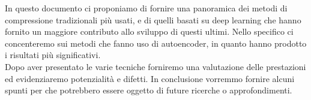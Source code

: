 \documentclass[12pt,a4paper,twoside,openright]{extreport}
\begin{document}
    In questo documento ci proponiamo di fornire una panoramica dei metodi di compressione tradizionali più usati, e di quelli basati su deep learning che hanno fornito un maggiore contributo allo sviluppo di questi ultimi. Nello specifico ci concenteremo sui metodi che fanno uso di autoencoder, in quanto hanno prodotto i risultati più significativi.\\
    Dopo aver presentato le varie tecniche forniremo una valutazione delle prestazioni ed evidenziaremo potenzialità e difetti. In conclusione vorremmo fornire alcuni spunti per che potrebbero essere oggetto di future ricerche o approfondimenti.
    \cleardoublepage

    \tableofcontents
    \cleardoublepage
    


    
    
    
    
    
    \cleardoublepage

    \printbibliography[heading=bibintoc]
\end{document}
